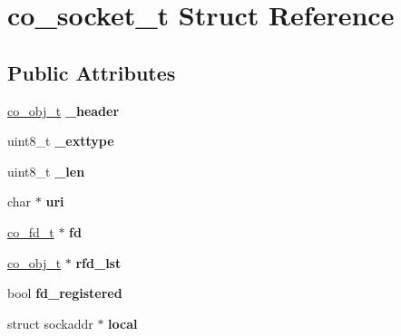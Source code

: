 \hypertarget{structco__socket__t}{\section{co\-\_\-socket\-\_\-t Struct Reference}
\label{structco__socket__t}
}
\subsection*{Public Attributes}
\begin{DoxyCompactItemize}
\item 
\hypertarget{structco__socket__t_a15cfa1d05f79ff825a2bf1cc642c550e}{\hyperlink{structco__obj__t}{co\-\_\-obj\-\_\-t} {\bfseries \-\_\-header}}\label{structco__socket__t_a15cfa1d05f79ff825a2bf1cc642c550e}

\item 
\hypertarget{structco__socket__t_a903dc2dbcce3df8145f00b6ff8d4df5e}{uint8\-\_\-t {\bfseries \-\_\-exttype}}\label{structco__socket__t_a903dc2dbcce3df8145f00b6ff8d4df5e}

\item 
\hypertarget{structco__socket__t_a40a7f1329f84097b24f19bebf9393253}{uint8\-\_\-t {\bfseries \-\_\-len}}\label{structco__socket__t_a40a7f1329f84097b24f19bebf9393253}

\item 
\hypertarget{structco__socket__t_ac11b40a1e999e998ba413a2669de7fcd}{char $\ast$ {\bfseries uri}}\label{structco__socket__t_ac11b40a1e999e998ba413a2669de7fcd}

\item 
\hypertarget{structco__socket__t_a47646b23fad18d0cfedd58fd2896a4a4}{\hyperlink{structco__fd__t}{co\-\_\-fd\-\_\-t} $\ast$ {\bfseries fd}}\label{structco__socket__t_a47646b23fad18d0cfedd58fd2896a4a4}

\item 
\hypertarget{structco__socket__t_af9905608f3a378735c7ec4c3d71ca801}{\hyperlink{structco__obj__t}{co\-\_\-obj\-\_\-t} $\ast$ {\bfseries rfd\-\_\-lst}}\label{structco__socket__t_af9905608f3a378735c7ec4c3d71ca801}

\item 
\hypertarget{structco__socket__t_ad6ed148323908011a8a3ac097673d383}{bool {\bfseries fd\-\_\-registered}}\label{structco__socket__t_ad6ed148323908011a8a3ac097673d383}

\item 
\hypertarget{structco__socket__t_a1f8a809c49b0ca11f0369215f332bb90}{struct sockaddr $\ast$ {\bfseries local}}\label{structco__socket__t_a1f8a809c49b0ca11f0369215f332bb90}


\end{DoxyCompactItemize}
